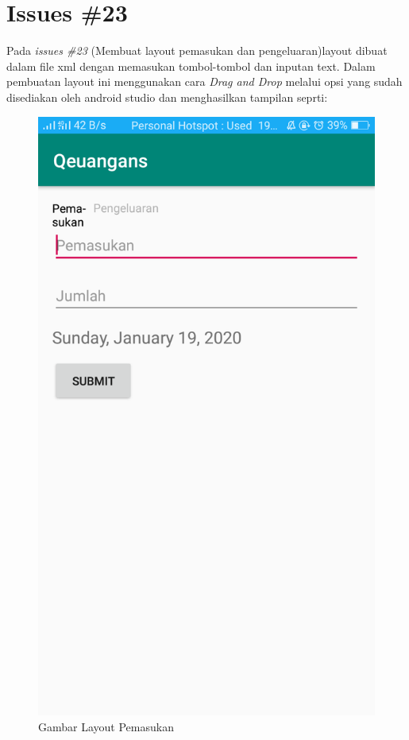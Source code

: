 \section{Issues \#23}
Pada \textit{issues \#23} (Membuat layout pemasukan dan pengeluaran)layout dibuat dalam file xml dengan memasukan tombol-tombol dan inputan text. Dalam pembuatan layout ini menggunakan cara \textit{Drag and Drop} melalui opsi yang sudah disediakan oleh android studio dan menghasilkan tampilan seprti: 
\begin{figure}[]
    \centering
    \includegraphics[scale = 0.3]{pictures/pemasukan_layout.png}
    \caption{Gambar Layout Pemasukan}
    \label{layout_pemasukan}


\end{figure}
